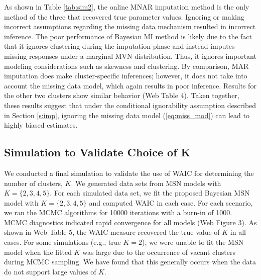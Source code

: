 \documentclass[useAMS,usenatbib,referee]{biom}
\begin{document}
As shown in Table \ref{tab:sim2}, the online MNAR imputation method is the only method of the three that recovered true parameter values. Ignoring or making incorrect assumptions regarding the missing data mechanism resulted in incorrect inference. The poor performance of Bayesian MI method is likely due to the fact that it ignores clustering during the imputation phase and instead imputes missing responses under a marginal MVN distribution. Thus, it ignores important modeling considerations such as skewness and clustering. By comparison, MAR imputation does make cluster-specific inferences; however, it does not take into account the missing data model, which again results in poor inference. Results for the other two clusters show similar behavior {(Web Table 4)}. Taken together, these results suggest that under the conditional ignorability assumption described in Section \ref{s:imp}, ignoring the missing data model (\ref{eq:miss_mod}) can lead to highly biased estimates.

\subsection{Simulation to Validate Choice of K}
\label{s:waic}
We conducted a final simulation to validate the use of WAIC for determining the number of clusters, $K$. We generated data sets from MSN models with $K = \{2,3,4,5\}$. For each simulated data set, we fit the proposed Bayesian MSN model with $K = \{2,3,4,5\}$ and computed WAIC in each case. For each scenario, we ran the MCMC algorithms for 10000 iterations with a burn-in of 1000. MCMC diagnostics indicated rapid convergence for all models (Web Figure 3). As shown in Web Table 5, the WAIC measure recovered the true value of $K$ in all cases. For some simulations (e.g., true $K = 2$), we were unable to fit the MSN model when the fitted $K$ was large due to the occurrence of vacant clusters during MCMC sampling. We have found that this generally occurs when the data do not support large values of $K$.
\end{document}
